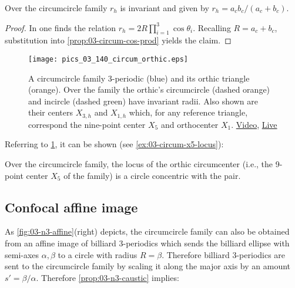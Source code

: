 
\begin{proposition}
Over the circumcircle family  $r_h$ is invariant and  given by $r_h=a_c b_c/(a_c+b_c)$. 
\label{prop:03-circumcircle-rh}
\end{proposition}

\begin{proof}
In \cite[Orthic Triangle, Eqn. 5]{mw} one finds the relation  $r_h=2 R \prod_{i=1}^3{\cos\theta_i}$. Recalling $R=a_c+b_c$, substitution into \cref{prop:03-circum-cos-prod} yields the claim.
\end{proof}

\begin{figure}
    \centering
    \texttt{[image: pics\_03\_140\_circum\_orthic.eps]}
    \caption{A circumcircle family 3-periodic (blue) and its orthic triangle (orange). Over the family the orthic's circumcircle (dashed orange) and incircle (dashed green) have invariant radii. Also shown are their centers $X_{3,h}$ and $X_{1,h}$ which, for any reference triangle, correspond the nine-point center $X_5$ and orthocenter $X_1$. \href{https://youtu.be/wUu2iMesv3U}{Video}, \href{https://bit.ly/2PHJZma}{Live}}
    \label{fig:03-circum-orthic}
\end{figure}


Referring to  \cref{fig:03-circum-orthic}, it can be shown (see \cref{ex:03-circum-x5-locus}):

\begin{lemma}
Over the circumcircle family, the locus of the orthic circumcenter (i.e., the 9-point center $X_5$ of the family) is a circle concentric with the pair.
\label{lem:03-circum-x5-locus}
\end{lemma}


\subsection{Confocal affine image} As \cref{fig:03-n3-affine}(right) depicts, the circumcircle family can also be obtained from an affine image of billiard 3-periodics which sends the billiard ellipse with semi-axes $\alpha,\beta$ to a circle with radius $R=\beta$. Therefore billiard 3-periodics are sent to the circumcircle family by scaling it along the major axis by an amount $s'={\beta/\alpha}$. Therefore \cref{prop:03-n3-caustic} implies:

